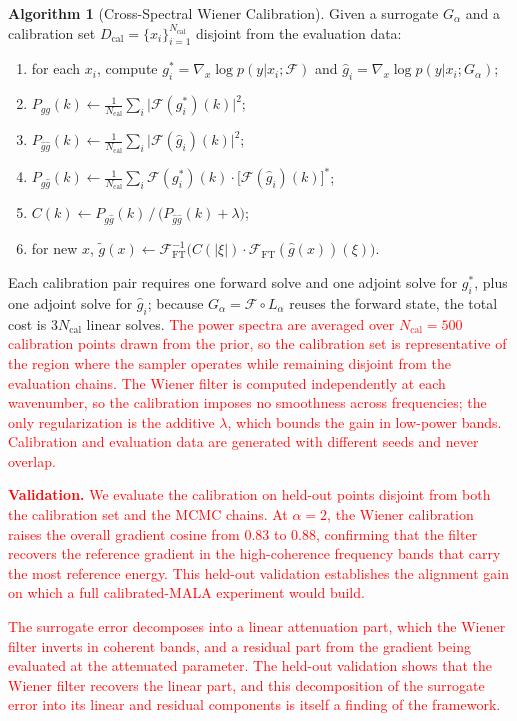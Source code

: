 \documentclass[12pt]{article}
\newcommand{\add}[1]{\textcolor{red}{#1}}
\begin{document}
\textbf{Algorithm 1} (Cross-Spectral Wiener Calibration). Given a surrogate $G_{\alpha}$ and a calibration set $D_{\mathrm{cal}}=\{x_i\}_{i=1}^{N_{\mathrm{cal}}}$ disjoint from the evaluation data:
\begin{enumerate}
\item for each $x_i$, compute $g^{*}_i=\nabla_x\log p(y|x_i;\mathcal{F})$ and $\hat g_i=\nabla_x\log p(y|x_i;G_{\alpha})$;
\item $P_{gg}(k)\leftarrow\frac{1}{N_{\mathrm{cal}}}\sum_i \big|\mathcal{F}(g^{*}_i)(k)\big|^2$;
\item $P_{\hat g\hat g}(k)\leftarrow\frac{1}{N_{\mathrm{cal}}}\sum_i \big|\mathcal{F}(\hat g_i)(k)\big|^2$;
\item $P_{g\hat g}(k)\leftarrow\frac{1}{N_{\mathrm{cal}}}\sum_i \mathcal{F}(g^{*}_i)(k)\cdot\big[\mathcal{F}(\hat g_i)(k)\big]^{*}$;
\item $C(k)\leftarrow P_{g\hat g}(k)\,\big/\,\big(P_{\hat g\hat g}(k)+\lambda\big)$;
\item for new $x$, $\tilde g(x)\leftarrow\mathcal{F}_{\mathrm{FT}}^{-1}\!\big(C(|\xi|)\cdot\mathcal{F}_{\mathrm{FT}}(\hat g(x))(\xi)\big)$.
\end{enumerate}
Each calibration pair requires one forward solve and one adjoint solve for $g^{*}_i$, plus one adjoint solve for $\hat g_i$; because $G_{\alpha}=\mathcal{F}\circ L_{\alpha}$ reuses the forward state, the total cost is $3N_{\mathrm{cal}}$ linear solves. \add{The power spectra are averaged over $N_{\mathrm{cal}}=500$ calibration points drawn from the prior, so the calibration set is representative of the region where the sampler operates while remaining disjoint from the evaluation chains. The Wiener filter is computed independently at each wavenumber, so the calibration imposes no smoothness across frequencies; the only regularization is the additive $\lambda$, which bounds the gain in low-power bands. Calibration and evaluation data are generated with different seeds and never overlap.}

\add{\textbf{Validation.} We evaluate the calibration on held-out points disjoint from both the calibration set and the MCMC chains. At $\alpha=2$, the Wiener calibration raises the overall gradient cosine from $0.83$ to $0.88$, confirming that the filter recovers the reference gradient in the high-coherence frequency bands that carry the most reference energy. This held-out validation establishes the alignment gain on which a full calibrated-MALA experiment would build.}

\add{The surrogate error decomposes into a linear attenuation part, which the Wiener filter inverts in coherent bands, and a residual part from the gradient being evaluated at the attenuated parameter. The held-out validation shows that the Wiener filter recovers the linear part, and this decomposition of the surrogate error into its linear and residual components is itself a finding of the framework.}
\end{document}
